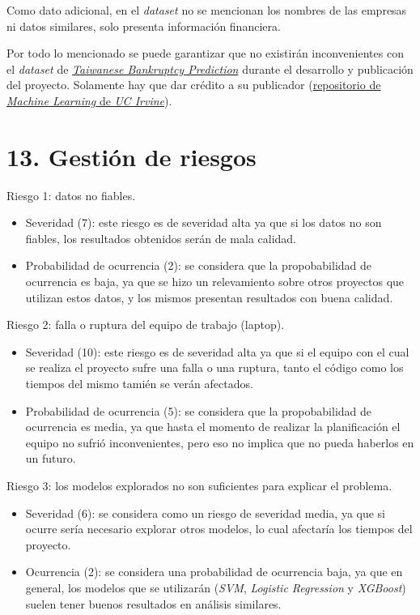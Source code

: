 \documentclass[
11pt, %
]{charter}
\begin{document}
Como dato adicional, en el \textit{dataset} no se mencionan los nombres de las empresas ni datos similares, solo presenta información financiera.

Por todo lo mencionado se puede garantizar que no existirán inconvenientes con el \textit{dataset} de \href{https://archive.ics.uci.edu/dataset/572/taiwanese+bankruptcy+prediction}{\textit{Taiwanese Bankruptcy Prediction}} durante el desarrollo y publicación del proyecto. Solamente hay que dar crédito a su publicador (\href{https://archive.ics.uci.edu/}{repositorio de \textit{Machine Learning} de \textit{UC Irvine}}).

\section{13. Gestión de riesgos}
\label{sec:riesgos}

Riesgo 1: datos no fiables.
\begin{itemize}
	\item Severidad (7): este riesgo es de severidad alta ya que si los datos no son fiables, los resultados obtenidos serán de mala calidad.
	\item Probabilidad de ocurrencia (2): se considera que la propobabilidad de ocurrencia es baja, ya que se hizo un relevamiento sobre otros proyectos que utilizan estos datos, y los mismos presentan resultados con buena calidad.
\end{itemize}   

Riesgo 2: falla o ruptura del equipo de trabajo (laptop).
\begin{itemize}
	\item Severidad (10): este riesgo es de severidad alta ya que si el equipo con el cual se realiza el proyecto sufre una falla o una ruptura, tanto el código como los tiempos del mismo tamién se verán afectados.
	\item Probabilidad de ocurrencia (5): se considera que la propobabilidad de ocurrencia es media, ya que hasta el momento de realizar la planificación el equipo no sufrió inconvenientes, pero eso no implica que no pueda haberlos en un futuro.
\end{itemize}   

Riesgo 3: los modelos explorados no son suficientes para explicar el problema.
\begin{itemize}
	\item Severidad (6): se considera como un riesgo de severidad media, ya que si ocurre sería necesario explorar otros modelos, lo cual afectaría los tiempos del proyecto.
	\item Ocurrencia (2): se considera una probabilidad de ocurrencia baja, ya que en general, los modelos que se utilizarán (\textit{SVM}, \textit{Logistic Regression} y \textit{XGBoost}) suelen tener buenos resultados en análisis similares.
\end{itemize}
\end{document}
